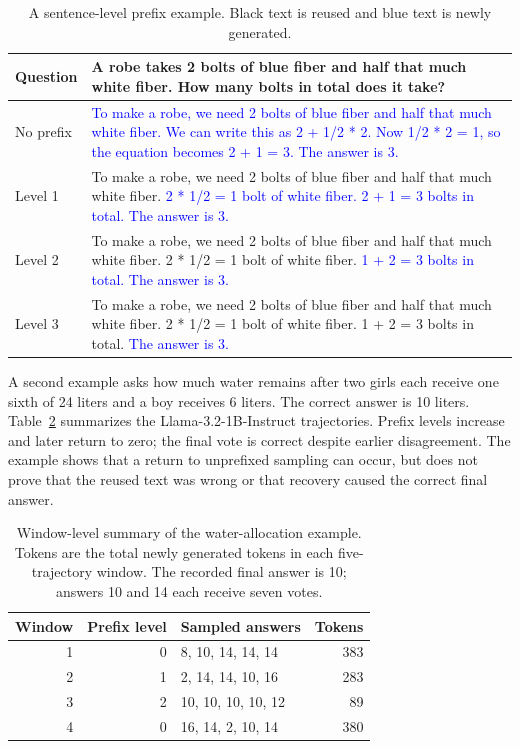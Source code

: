 \begin{table}[!htbp]
\centering\small
\caption{A sentence-level prefix example. Black text is reused and blue text is newly generated.}
\label{tab:sentence_example}
\begin{tabularx}{\linewidth}{@{}lX@{}}
\toprule
Question & A robe takes 2 bolts of blue fiber and half that much white fiber. How many bolts in total does it take?\\
\midrule
No prefix & \textcolor{blue}{To make a robe, we need 2 bolts of blue fiber and half that much white fiber. We can write this as 2 + 1/2 * 2. Now 1/2 * 2 = 1, so the equation becomes 2 + 1 = 3. The answer is 3.}\\
\midrule
Level 1 & To make a robe, we need 2 bolts of blue fiber and half that much white fiber. \textcolor{blue}{2 * 1/2 = 1 bolt of white fiber. 2 + 1 = 3 bolts in total. The answer is 3.}\\
\midrule
Level 2 & To make a robe, we need 2 bolts of blue fiber and half that much white fiber. 2 * 1/2 = 1 bolt of white fiber. \textcolor{blue}{1 + 2 = 3 bolts in total. The answer is 3.}\\
\midrule
Level 3 & To make a robe, we need 2 bolts of blue fiber and half that much white fiber. 2 * 1/2 = 1 bolt of white fiber. 1 + 2 = 3 bolts in total. \textcolor{blue}{The answer is 3.}\\
\bottomrule
\end{tabularx}
\end{table}

A second example asks how much water remains after two girls each receive one sixth of 24 liters and a boy receives 6 liters. The correct answer is 10 liters. Table~\ref{tab:sentence_recovery} summarizes the Llama-3.2-1B-Instruct trajectories. Prefix levels increase and later return to zero; the final vote is correct despite earlier disagreement. The example shows that a return to unprefixed sampling can occur, but does not prove that the reused text was wrong or that recovery caused the correct final answer.

\begin{table}[!htbp]
\centering\small
\caption{Window-level summary of the water-allocation example. Tokens are the total newly generated tokens in each five-trajectory window. The recorded final answer is 10; answers 10 and 14 each receive seven votes.}
\label{tab:sentence_recovery}
\begin{tabular}{@{}rrlr@{}}
\toprule
Window & Prefix level & Sampled answers & Tokens\\
\midrule
1 & 0 & 8, 10, 14, 14, 14 & 383\\
2 & 1 & 2, 14, 14, 10, 16 & 283\\
3 & 2 & 10, 10, 10, 10, 12 & 89\\
4 & 0 & 16, 14, 2, 10, 14 & 380\\
\bottomrule
\end{tabular}
\end{table}


